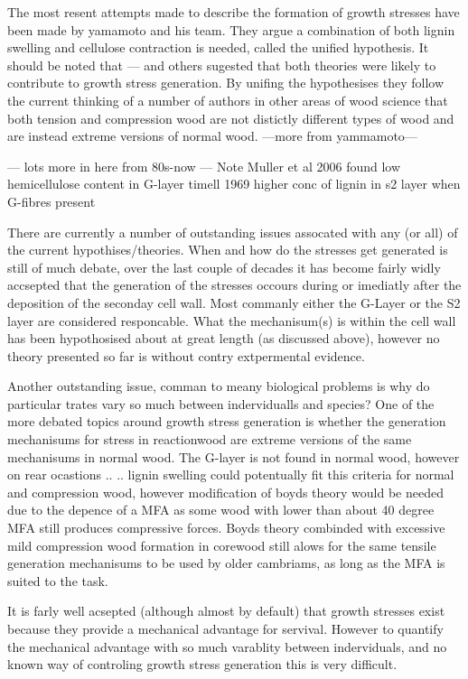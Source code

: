 \documentclass{article}
\begin{document}
The most resent attempts made to describe the formation of growth stresses have
been made by yamamoto and his team. They argue a combination of both lignin
swelling and cellulose contraction is needed, called the unified hypothesis. It
should be noted that --- and others sugested that both theories were likely to
contribute to growth stress generation. By unifing the hypothesises they follow
the current thinking of a number of authors in other areas of wood science that
both tension and compression wood are not distictly different types of wood and
are instead extreme versions of normal wood. ---more from yammamoto---


--- lots more in here from 80s-now ---
Note Muller et al 2006 found low hemicellulose content in G-layer
timell 1969 higher conc of lignin in s2 layer when G-fibres present

There are currently a number of outstanding issues assocated with any (or all)
of the current hypothises/theories. When and how do the stresses get
generated is still of much debate, over the last couple of decades it has become
fairly widly accsepted that the generation of the stresses occours during or
imediatly after the deposition of the seconday cell wall. Most commanly either
the G-Layer or the S2 layer are considered responcable. What the mechanisum(s)
is within the cell wall has been hypothosised about at great length (as
discussed above), however no theory presented so far is without contry
extpermental evidence.

Another outstanding issue, comman to meany biological problems is why do
particular trates vary so much between indervidualls and species? One of the
more debated topics around growth stress generation is whether the generation
mechanisums for stress in reactionwood are extreme versions of the same
mechanisums in normal wood. The G-layer is not found in normal wood, however on
rear ocastions .. .. lignin swelling could potentually fit this criteria for
normal and compression wood, however modification of boyds theory would be
needed due to the depence of a MFA as some wood with lower than about 40 degree
MFA still produces compressive forces. Boyds theory combinded with excessive
mild compression wood formation in corewood still alows for the same tensile
generation mechanisums to be used by older cambriams, as long as the MFA is
suited to the task.

It is farly well acsepted (although almost by default) that growth stresses
exist because they provide a mechanical advantage for servival. However to
quantify the mechanical advantage with so much varablity between inderviduals,
and no known way of controling growth stress generation this is very difficult.
\end{document}
